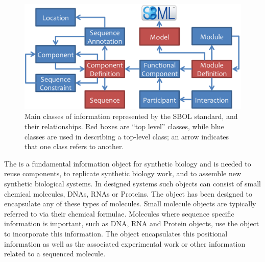 \begin{figure}[ht]
\begin{center}
\includegraphics[scale=1.2]{images/SBOL2_2_revised.png}
\caption{Main classes of information represented by the SBOL standard, and their relationships.  Red boxes are ``top level'' classes, while blue classes are used in describing a top-level class; an arrow indicates that one class refers to another.}
\label{images:overview2}
\end{center}
\end{figure}

The  is a fundamental information object for synthetic biology and is needed to reuse components, to replicate synthetic biology work, and to assemble new synthetic biological systems. In designed systems such objects can consist of small chemical molecules, DNAs, RNAs or Proteins. The  object has been designed to encapsulate any of these types of molecules. Small molecule  objects are typically referred to via their chemical formulae. Molecules where sequence specific information is important, such as DNA, RNA and Protein  objects, use the object to incorporate this information. The  object encapsulates this positional information as well as the associated experimental work or other information related to a sequenced molecule.


